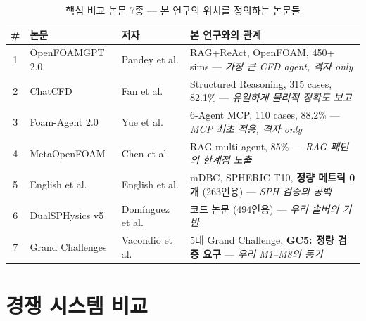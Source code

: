\documentclass[12pt,a4paper]{article}
\begin{document}
\begin{table}[htbp]
\centering
\caption{핵심 비교 논문 7종 — 본 연구의 위치를 정의하는 논문들}
\label{tab:key-papers}
\small
\begin{tabular}{clp{3.5cm}p{6.5cm}}
\toprule
\# & \textbf{논문} & \textbf{저자} & \textbf{본 연구와의 관계} \\
\midrule
1 & OpenFOAMGPT 2.0 & Pandey et al. & RAG+ReAct, OpenFOAM, 450+ sims --- \textit{가장 큰 CFD agent, 격자 only} \\
2 & ChatCFD & Fan et al. & Structured Reasoning, 315 cases, 82.1\% --- \textit{유일하게 물리적 정확도 보고} \\
3 & Foam-Agent 2.0 & Yue et al. & 6-Agent MCP, 110 cases, 88.2\% --- \textit{MCP 최초 적용, 격자 only} \\
4 & MetaOpenFOAM & Chen et al. & RAG multi-agent, 85\% --- \textit{RAG 패턴의 한계점 노출} \\
5 & English et al. & English et al. & mDBC, SPHERIC T10, \textbf{정량 메트릭 0개} (263인용) --- \textit{SPH 검증의 공백} \\
6 & DualSPHysics v5 & Domínguez et al. & 코드 논문 (494인용) --- \textit{우리 솔버의 기반} \\
7 & Grand Challenges & Vacondio et al. & 5대 Grand Challenge, \textbf{GC5: 정량 검증 요구} --- \textit{우리 M1--M8의 동기} \\
\bottomrule
\end{tabular}
\end{table}

\section{경쟁 시스템 비교}
\end{document}
